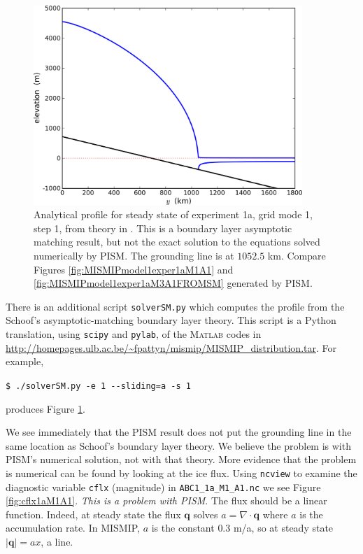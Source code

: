 \documentclass[11pt,final]{amsart}
\newcommand{\Matlab}{\textsc{Matlab}\xspace}
\newcommand{\bq}{\mathbf{q}}
\newcommand{\Div}{\nabla\cdot}
\begin{document}
\begin{figure}[ht]
\includegraphics[width=4.0in,keepaspectratio=true]{figs/SM_1a_A1}
\caption{Analytical profile for steady state of experiment 1a, grid mode 1, step 1, from theory in \cite{SchoofMarine1}.  This is a boundary layer asymptotic matching result, but not the exact solution to the equations solved numerically by PISM.  The grounding line is at $1052.5$ km.  Compare Figures \ref{fig:MISMIPmodel1exper1aM1A1} and \ref{fig:MISMIPmodel1exper1aM3A1FROMSM} generated by PISM.}
\label{fig:SMexper1aM1A1}
\end{figure}

There is an additional script \verb|solverSM.py| which computes the profile from the Schoof's \cite{SchoofMarine1} asymptotic-matching boundary layer theory.  This script is a Python translation, using \verb|scipy| and \verb|pylab|, of the \Matlab codes in \url{http://homepages.ulb.ac.be/~fpattyn/mismip/MISMIP_distribution.tar}.  For example,

\verb|$ ./solverSM.py -e 1 --sliding=a -s 1|

\noindent produces Figure \ref{fig:SMexper1aM1A1}.

We see immediately that the PISM result does not put the grounding line in the same location as Schoof's boundary layer theory.  We believe the problem is with PISM's numerical solution, not with that theory.  More evidence that the problem is numerical can be found by looking at the ice flux.  Using \verb|ncview| to examine the diagnostic variable \verb|cflx| (magnitude) in \verb|ABC1_1a_M1_A1.nc| we see Figure \ref{fig:cflx1aM1A1}.  \emph{This is a problem with PISM}.  The flux should be a linear function.  Indeed, at steady state the flux $\bq$ solves $a=\Div\bq$ where $a$ is the accumulation rate.  In MISMIP, $a$ is the constant $0.3$ m/a, so at steady state $|\bq| = a x$, a line.
\end{document}
